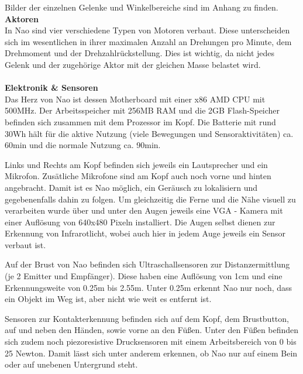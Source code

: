 Bilder der einzelnen Gelenke und Winkelbereiche sind im Anhang zu finden.
\noindent
\textbf{Aktoren}
\\
In Nao sind vier verschiedene Typen von Motoren verbaut. Diese unterscheiden sich im wesentlichen in ihrer maximalen Anzahl an Drehungen pro Minute, dem Drehmoment und der Drehzahlrückstellung. Dies ist wichtig, da nicht jedes Gelenk und der zugehörige Aktor mit der gleichen Masse belastet wird.
\\
\\
\textbf{Elektronik \& Sensoren}
\\
Das Herz von Nao ist dessen Motherboard mit einer x86 AMD CPU mit 500MHz. Der Arbeitsspeicher mit 256MB RAM und die 2GB Flash-Speicher befinden sich zusammen mit dem Prozessor im Kopf.  Die Batterie mit rund 30Wh hält für die aktive Nutzung (viele Bewegungen und Sensoraktivitäten) ca. 60min und die normale Nutzung ca. 90min. 

Links und Rechts am Kopf befinden sich jeweils ein Lautsprecher und ein Mikrofon. Zusätliche Mikrofone sind am Kopf auch noch vorne und hinten angebracht. Damit ist es Nao möglich, ein Geräusch zu lokalisiern und gegebenenfalls dahin zu folgen. Um gleichzeitig die Ferne und die Nähe visuell zu verarbeiten wurde über und unter den Augen jeweils eine VGA - Kamera mit einer Auflösung von 640x480 Pixeln installiert. Die Augen selbst dienen zur Erkennung von Infrarotlicht, wobei auch hier in jedem Auge jeweils ein Sensor verbaut ist.

Auf der Brust von Nao befinden sich Ultraschallsensoren zur Distanzermittlung (je 2 Emitter und Empfänger). Diese haben eine Auflösung von 1cm und eine Erkennungsweite von 0.25m bis 2.55m. Unter 0.25m erkennt Nao nur noch, dass ein Objekt im Weg ist, aber nicht wie weit es entfernt ist.

Sensoren zur Kontakterkennung befinden sich auf dem Kopf, dem Brustbutton, auf und neben den Händen, sowie vorne an den Füßen. Unter den Füßen befinden sich zudem noch piezoresistive Drucksensoren mit einem Arbeitsbereich von 0 bis 25 Newton. Damit lässt sich unter anderem erkennen, ob Nao nur auf einem Bein oder auf unebenen Untergrund steht.




